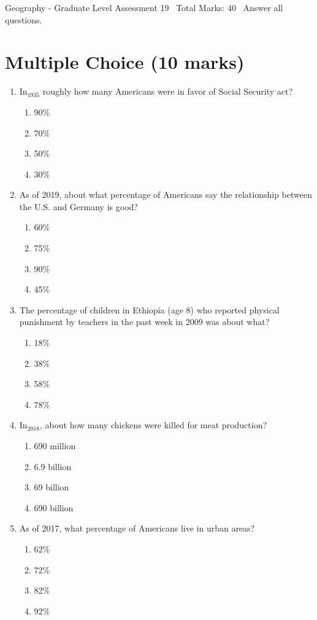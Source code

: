 \documentclass[12pt]{article}
\begin{document}
\begin{center}
Geography - Graduate Level Assessment 19 \
Total Marks: 40 \
Answer all questions.
\end{center}

\section*{Multiple Choice (10 marks)}
\begin{enumerate}[label=\arabic*.]
\item In$_{1935}$ roughly how many Americans were in favor of Social Security act?
\begin{enumerate}[label=(\alph*)]
    \item 90\%
    \item 70\%
    \item 50\%
    \item 30\%
\end{enumerate}
\item As of 2019, about what percentage of Americans say the relationship between the U.S. and Germany is good?
\begin{enumerate}[label=(\alph*)]
    \item 60\%
    \item 75\%
    \item 90\%
    \item 45\%
\end{enumerate}
\item The percentage of children in Ethiopia (age 8) who reported physical punishment by teachers in the past week in 2009 was about what?
\begin{enumerate}[label=(\alph*)]
    \item 18\%
    \item 38\%
    \item 58\%
    \item 78\%
\end{enumerate}
\item In$_{2018}$, about how many chickens were killed for meat production?
\begin{enumerate}[label=(\alph*)]
    \item 690 million
    \item 6.9 billion
    \item 69 billion
    \item 690 billion
\end{enumerate}
\item As of 2017, what percentage of Americans live in urban areas?
\begin{enumerate}[label=(\alph*)]
    \item 62\%
    \item 72\%
    \item 82\%
    \item 92\%
\end{enumerate}
\end{enumerate}
\end{document}
